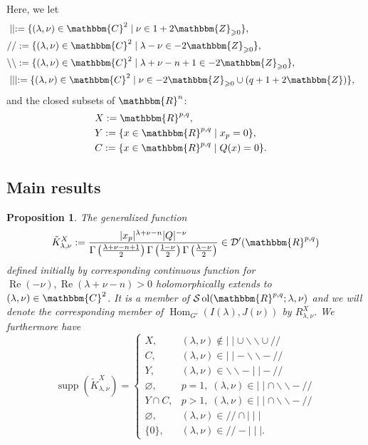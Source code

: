 \documentclass[12pt]{article}
\newcommand{\assign}{:=}
\newcommand{\nin}{\not\in}
\newcommand{\tmop}[1]{\ensuremath{\operatorname{#1}}}
\newtheorem{proposition}{Proposition}[section]
\theoremstyle{remark}
\begin{document}
Here, we let
\begin{eqnarray}
  & \mid \mid \assign \{ (\lambda, \nu) \in \mathbbm{C}^2 \mid \nu \in 1 +
  2\mathbbm{Z}_{\geqslant 0} \}, &  \nonumber\\
  & / / \assign \{ (\lambda, \nu) \in \mathbbm{C}^2 \mid \lambda - \nu \in -
  2\mathbbm{Z}_{\geqslant 0} \}, &  \nonumber\\
  & \backslash\backslash \assign \{ (\lambda, \nu) \in \mathbbm{C}^2 \mid
  \lambda + \nu - n + 1 \in - 2\mathbbm{Z}_{\geqslant 0} \}, &  \nonumber\\
  & \mid \mid \mid \assign \{ (\lambda, \nu) \in \mathbbm{C}^2 \mid \nu \in -
  2\mathbbm{Z}_{\geqslant 0} \cup (q + 1 + 2\mathbbm{Z}) \}, &  \nonumber
\end{eqnarray}
and the closed subsets of $\mathbbm{R}^n$:
\begin{eqnarray}
  & X \assign \mathbbm{R}^{p, q}, &  \nonumber\\
  & Y \assign \{ x \in \mathbbm{R}^{p, q} \mid x_p = 0 \}, &  \nonumber\\
  & C \assign \{ x \in \mathbbm{R}^{p, q} \mid Q (x) = 0 \} . &  \nonumber
\end{eqnarray}

\subsection{Main results}

\begin{proposition}
  \label{supp-R:prop-main}The generalized function
  \[ \tilde{K}_{\lambda, \nu}^X \assign \frac{| x_p |^{\lambda + \nu - n} | Q
     |^{- \nu}}{\Gamma \left( \frac{\lambda + \nu - n + 1}{2} \right) \Gamma
     \left( \frac{1 - \nu}{2} \right) \Gamma \left( \frac{\lambda - \nu}{2}
     \right)} \in \mathcal{D}' (\mathbbm{R}^{p, q}) \]
  defined initially by corresponding continuous function for $\tmop{Re} (-
  \nu), \tmop{Re} (\lambda + \nu - n) > 0$ holomorphically extends to
  $(\lambda, \nu) \in \mathbbm{C}^2$. It is a member of $\mathcal{S} \tmop{ol}
  (\mathbbm{R}^{p, q} ; \lambda, \nu)$ and we will denote the corresponding
  member of $\tmop{Hom}_{G'} (I (\lambda), J (\nu))$ by $R_{\lambda, \nu}^X$.
  We furthermore have
  \[ \tmop{supp} (\tilde{K}_{\lambda, \nu}^X) = \left\{ \begin{array}{ll}
       X, & (\lambda, \nu) \nin \mid \mid \cup \backslash\backslash \cup / /\\
       C, & (\lambda, \nu) \in \mid \mid -\backslash\backslash - / /\\
       Y, & (\lambda, \nu) \in \backslash\backslash - \mid \mid - / /\\
       \varnothing, & p = 1, \; (\lambda, \nu) \in \mid \mid \cap
       \backslash\backslash - / /\\
       Y \cap C, & p > 1, \; (\lambda, \nu) \in \mid \mid \cap
       \backslash\backslash - / /\\
       \varnothing, & (\lambda, \nu) \in / / \cap \mid \mid \mid\\
       \{ 0 \}, & (\lambda, \nu) \in / / - \mid \mid \mid .
     \end{array} \right. \]
\end{proposition}
\end{document}
